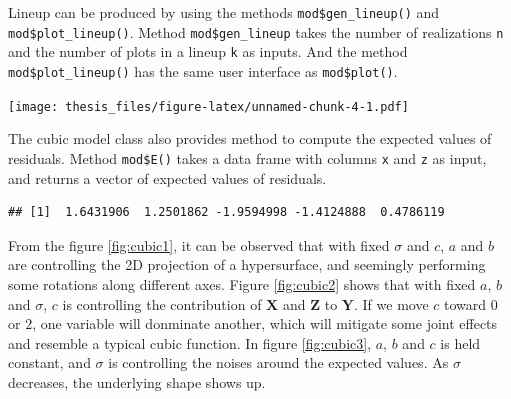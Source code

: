 \documentclass{monashthesis}
\begin{document}
Lineup can be produced by using the methods \texttt{mod\$gen\_lineup()} and \texttt{mod\$plot\_lineup()}. Method \texttt{mod\$gen\_lineup} takes the number of realizations \texttt{n} and the number of plots in a lineup \texttt{k} as inputs. And the method \texttt{mod\$plot\_lineup()} has the same user interface as \texttt{mod\$plot()}.

\begin{Shaded}
\begin{Highlighting}[]
\SpecialCharTok{$}\SpecialCharTok{$}\NormalTok{(} \NormalTok{, } \NormalTok{), } \NormalTok{, } \NormalTok{)}
\end{Highlighting}
\end{Shaded}

\texttt{[image: thesis\_files/figure-latex/unnamed-chunk-4-1.pdf]}

The cubic model class also provides method to compute the expected values of residuals. Method \texttt{mod\$E()} takes a data frame with columns \texttt{x} and \texttt{z} as input, and returns a vector of expected values of residuals.

\begin{Shaded}
\begin{Highlighting}[]
\SpecialCharTok{$}\SpecialCharTok{$}\NormalTok{(} \NormalTok{))}
\end{Highlighting}
\end{Shaded}

\begin{verbatim}
## [1]  1.6431906  1.2501862 -1.9594998 -1.4124888  0.4786119
\end{verbatim}

From the figure \ref{fig:cubic1}, it can be observed that with fixed \(\sigma\) and \(c\), \(a\) and \(b\) are controlling the 2D projection of a hypersurface, and seemingly performing some rotations along different axes. Figure \ref{fig:cubic2} shows that with fixed \(a\), \(b\) and \(\sigma\), \(c\) is controlling the contribution of \(\boldsymbol{X}\) and \(\boldsymbol{Z}\) to \(\boldsymbol{Y}\). If we move \(c\) toward \(0\) or \(2\), one variable will donminate another, which will mitigate some joint effects and resemble a typical cubic function. In figure \ref{fig:cubic3}, \(a\), \(b\) and \(c\) is held constant, and \(\sigma\) is controlling the noises around the expected values. As \(\sigma\) decreases, the underlying shape shows up.
\end{document}
